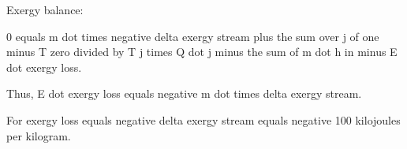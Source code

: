 Exergy balance:  

0 equals m dot times negative delta exergy stream plus the sum over j of one minus T zero divided by T j times Q dot j minus the sum of m dot h in minus E dot exergy loss.  

Thus, E dot exergy loss equals negative m dot times delta exergy stream.  

For exergy loss equals negative delta exergy stream equals negative 100 kilojoules per kilogram.